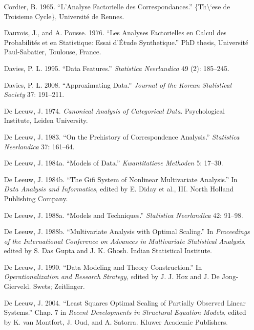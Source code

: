 \documentclass[
  12pt,
  letterpaper,
  DIV=11,
  numbers=noendperiod]{scrreprt}
\newlength{\cslhangindent}
\newenvironment{CSLReferences}[2] %
 {\begin{list}{}{%
  \setlength{\itemindent}{0pt}
  \setlength{\leftmargin}{0pt}
  \setlength{\parsep}{0pt}
  \ifodd #1
   \setlength{\leftmargin}{\cslhangindent}
   \setlength{\itemindent}{-1\cslhangindent}
  \fi
  \setlength{\itemsep}{#2\baselineskip}}}
 {\end{list}}
\begin{document}
\begin{CSLReferences}{1}{1}
Cordier, B. 1965. {``{L'Analyse Factorielle des Correspondances}.''}
\{Th\textbackslash`ese de Troisieme Cycle\}, Université de Rennes.

Dauxois, J., and A. Pousse. 1976. {``{Les Analyses Factorielles en
Calcul des Probabilités et en Statistique: Essai d'Étude
Synthetique}.''} PhD thesis, Université Paul-Sabatier, Toulouse, France.

Davies, P. L. 1995. {``{Data Features}.''} \emph{Statistica Neerlandica}
49 (2): 185--245.

Davies, P. L. 2008. {``{Approximating Data}.''} \emph{Journal of the
Korean Statistical Society} 37: 191--211.

De Leeuw, J. 1974. \emph{Canonical Analysis of Categorical Data}.
Psychological Institute, Leiden University.

De Leeuw, J. 1983. {``On the Prehistory of Correspondence Analysis.''}
\emph{Statistica Neerlandica} 37: 161--64.

De Leeuw, J. 1984a. {``Models of Data.''} \emph{Kwantitatieve Methoden}
5: 17--30.

De Leeuw, J. 1984b. {``The Gifi System of Nonlinear Multivariate
Analysis.''} In \emph{Data Analysis and Informatics}, {edited by E.
Diday et al.}, III. North Holland Publishing Company.

De Leeuw, J. 1988a. {``Models and Techniques.''} \emph{Statistica
Neerlandica} 42: 91--98.

De Leeuw, J. 1988b. {``{Multivariate Analysis with Optimal Scaling}.''}
In \emph{Proceedings of the International Conference on Advances in
Multivariate Statistical Analysis}, edited by S. Das Gupta and J. K.
Ghosh. Indian Statistical Institute.

De Leeuw, J. 1990. {``Data Modeling and Theory Construction.''} In
\emph{Operationalization and Research Strategy}, edited by J. J. Hox and
J. De Jong-Gierveld. Swets; Zeitlinger.

De Leeuw, J. 2004. {``Least Squares Optimal Scaling of Partially
Observed Linear Systems.''} Chap. 7 in \emph{Recent Developments in
Structural Equation Models}, edited by K. van Montfort, J. Oud, and A.
Satorra. Kluwer Academic Publishers.


\end{CSLReferences}
\end{document}
